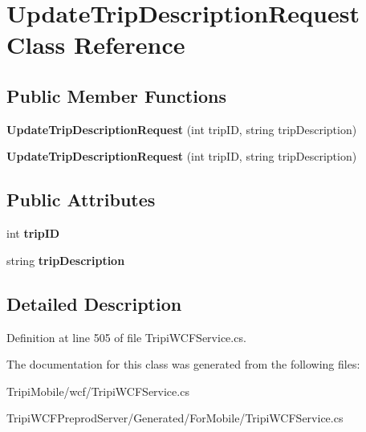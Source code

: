 \hypertarget{class_update_trip_description_request}{
\section{UpdateTripDescriptionRequest Class Reference}
\label{class_update_trip_description_request}
}
\subsection*{Public Member Functions}
\begin{DoxyCompactItemize}
\item 
\hypertarget{class_update_trip_description_request_a12ac8a322b9a1cfe211ad2e535cef1a0}{
{\bfseries UpdateTripDescriptionRequest} (int tripID, string tripDescription)}
\label{class_update_trip_description_request_a12ac8a322b9a1cfe211ad2e535cef1a0}

\item 
\hypertarget{class_update_trip_description_request_a12ac8a322b9a1cfe211ad2e535cef1a0}{
{\bfseries UpdateTripDescriptionRequest} (int tripID, string tripDescription)}
\label{class_update_trip_description_request_a12ac8a322b9a1cfe211ad2e535cef1a0}

\end{DoxyCompactItemize}
\subsection*{Public Attributes}
\begin{DoxyCompactItemize}
\item 
\hypertarget{class_update_trip_description_request_a8b6ea12c1258a1aff48c34db4bb6da05}{
int {\bfseries tripID}}
\label{class_update_trip_description_request_a8b6ea12c1258a1aff48c34db4bb6da05}

\item 
\hypertarget{class_update_trip_description_request_a8f6c6a9797f6bd5826ebc912f3f1d78a}{
string {\bfseries tripDescription}}
\label{class_update_trip_description_request_a8f6c6a9797f6bd5826ebc912f3f1d78a}

\end{DoxyCompactItemize}


\subsection{Detailed Description}


Definition at line 505 of file TripiWCFService.cs.

The documentation for this class was generated from the following files:\begin{DoxyCompactItemize}
\item 
TripiMobile/wcf/TripiWCFService.cs\item 
TripiWCFPreprodServer/Generated/ForMobile/TripiWCFService.cs\end{DoxyCompactItemize}
